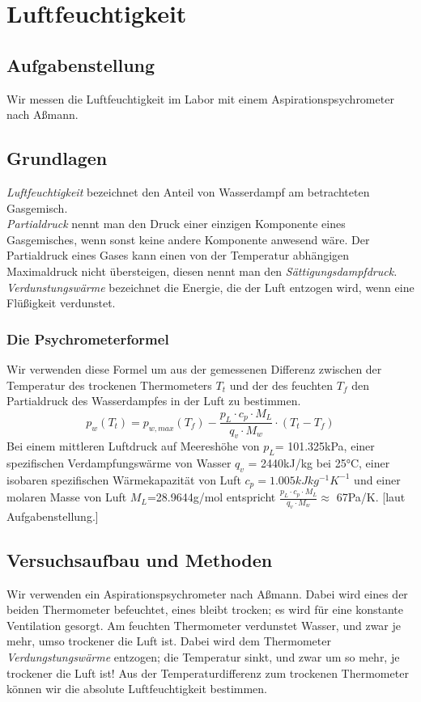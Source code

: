 \documentclass{article}
\begin{document}
\section{Luftfeuchtigkeit}
\subsection{Aufgabenstellung}
Wir messen die Luftfeuchtigkeit im Labor mit einem Aspirationspsychrometer nach Aßmann.
\subsection{Grundlagen}
\textit{Luftfeuchtigkeit} bezeichnet den Anteil von Wasserdampf am betrachteten Gasgemisch. \\
\textit{Partialdruck} nennt man den Druck einer einzigen Komponente eines Gasgemisches, wenn sonst keine andere Komponente anwesend wäre. Der Partialdruck eines Gases kann einen von der Temperatur abhängigen Maximaldruck nicht übersteigen, diesen nennt man den \textit{Sättigungsdampfdruck.}	\\
\textit{Verdunstungswärme} bezeichnet die Energie, die der Luft entzogen wird, wenn eine Flüßigkeit verdunstet. \\
\subsubsection*{Die Psychrometerformel}
Wir verwenden diese Formel um aus der gemessenen Differenz zwischen der Temperatur des trockenen Thermometers $T_t$ und der des feuchten $T_f$ den Partialdruck des Wasserdampfes in der Luft zu bestimmen.
\begin{equation}
\label{psychrometerformel}
p_w(T_t)=p_{w,max}(T_f)-\frac{p_L\cdot c_p \cdot M_L}{q_v\cdot M_w} \cdot (T_t - T_f)
\end{equation}
Bei einem mittleren Luftdruck auf Meereshöhe von $p_L$= 101.325kPa, einer spezifischen Verdampfungswärme von Wasser $q_v$ = 2440kJ/kg bei 25°C, einer isobaren spezifischen Wärmekapazität von Luft $c_p=1.005kJkg^{-1}K^{-1}$ und einer molaren Masse von Luft $M_L$=28.9644g/mol entspricht $\frac{p_L\cdot c_p \cdot M_L}{q_v\cdot M_w} \approx $ 67Pa/K. [laut Aufgabenstellung.]
\subsection{Versuchsaufbau und Methoden}
Wir verwenden ein Aspirationspsychrometer nach Aßmann. Dabei wird eines der beiden Thermometer befeuchtet, eines bleibt trocken; es wird für eine konstante Ventilation gesorgt. Am feuchten Thermometer verdunstet Wasser, und zwar je mehr, umso trockener die Luft ist. Dabei wird dem Thermometer \textit{Verdungstungswärme} entzogen; die Temperatur sinkt, und zwar um so mehr, je trockener die Luft ist! Aus der Temperaturdifferenz zum trockenen Thermometer können wir die absolute Luftfeuchtigkeit bestimmen. 
\end{document}
